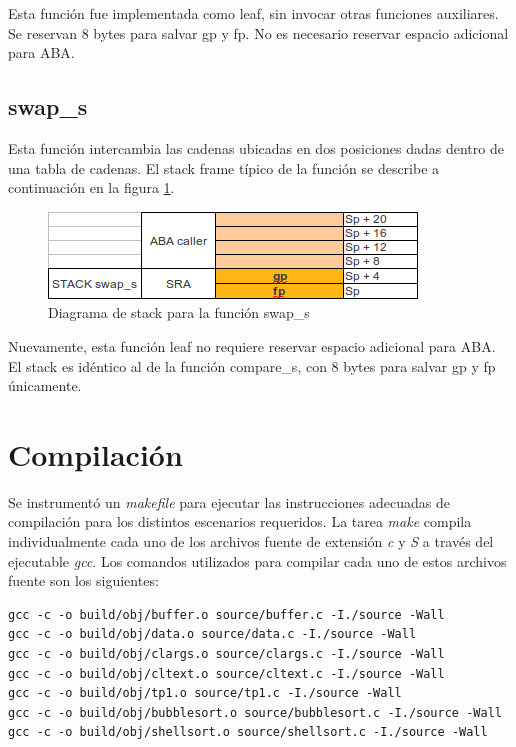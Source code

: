 \documentclass[a4paper,11pt]{article}
\begin{document}
\FloatBarrier

Esta función fue implementada como leaf, sin invocar otras funciones
auxiliares. Se reservan 8 bytes para salvar gp y fp. No es necesario reservar
espacio adicional para ABA.

\subsection{swap\_s}

Esta función intercambia las cadenas ubicadas en dos posiciones dadas dentro de
una tabla de cadenas. El stack frame típico de la función se describe a
continuación en la figura \ref{fig:stackswap}.

\begin{figure}[h!]
  \centering
  \includegraphics[width=\textwidth]{docs/stack_swap_s.png}
  \caption{Diagrama de stack para la función swap\_s} \label{fig:stackswap}
\end{figure}

\FloatBarrier

Nuevamente, esta función leaf no requiere reservar espacio adicional para ABA.
El stack es idéntico al de la función compare\_s, con 8 bytes para salvar gp y
fp únicamente.

\section{Compilación}

Se instrumentó un \textit{makefile} para ejecutar las instrucciones adecuadas
de compilación para los distintos escenarios requeridos. La
tarea \textit{make} compila individualmente cada uno de los archivos fuente de
extensión \textit{c} y \textit{S} a través del ejecutable \textit{gcc}.
Los comandos utilizados para compilar cada uno de estos archivos fuente son los
siguientes:

\begin{lstlisting}
gcc -c -o build/obj/buffer.o source/buffer.c -I./source -Wall 
gcc -c -o build/obj/data.o source/data.c -I./source -Wall 
gcc -c -o build/obj/clargs.o source/clargs.c -I./source -Wall 
gcc -c -o build/obj/cltext.o source/cltext.c -I./source -Wall 
gcc -c -o build/obj/tp1.o source/tp1.c -I./source -Wall 
gcc -c -o build/obj/bubblesort.o source/bubblesort.c -I./source -Wall 
gcc -c -o build/obj/shellsort.o source/shellsort.c -I./source -Wall 
\end{lstlisting}
\end{document}
